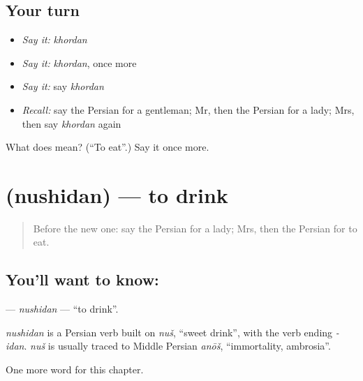 \subsection*{Your turn}
\begin{itemize}
\raggedright
  \item \emph{Say it:} \emph{khordan}
  \item \emph{Say it:} \emph{khordan}, once more
  \item \emph{Say it:} say \emph{khordan}
  \item \emph{Recall:} say the Persian for a gentleman; Mr, then the Persian for a lady; Mrs, then say \emph{khordan} again
\end{itemize}

\begin{tcolorbox}[breakable,colback=teal!4,colframe=teal!35!black,title={Before you move on}]
What does  mean? (\textquotedblleft{}To eat\textquotedblright{}.) Say it once more.
\end{tcolorbox}
\section[\texorpdfstring{\fa{نوشیدن} (nushidan)}{نوشیدن (nushidan)}]{ (nushidan) — to drink}

\label{lesson:FA-C35-nushidan}



\begin{quote}
Before the new one: say the Persian for a lady; Mrs, then the Persian for to eat.
\end{quote}

\subsection*{You'll want to know: }
\textbf{} — \emph{nushidan} — \textquotedblleft{}to drink\textquotedblright{}.

\begin{cousinweb}
\emph{nushidan} is a Persian verb built on \emph{nuš}, \textquotedblleft{}sweet drink\textquotedblright{}, with the verb ending \emph{-idan}. \emph{nuš} is usually traced to Middle Persian \emph{anōš}, \textquotedblleft{}immortality, ambrosia\textquotedblright{}.
\end{cousinweb}

\begin{grammarlens}[title={What you've built}]
One more word for this chapter.
\end{grammarlens}

